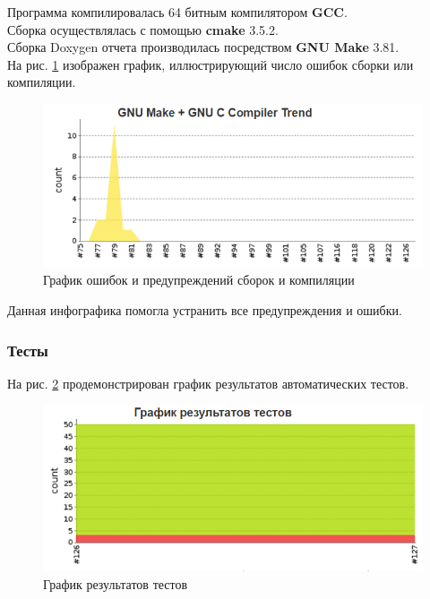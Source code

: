 Программа компилировалась 64 битным компилятором \textbf{GCC}.\\
Сборка осуществлялась с помощью \textbf{cmake} 3.5.2.\\

Сборка Doxygen отчета производилась посредством \textbf{GNU Make} 3.81.\\

На рис. \ref{pic:jenkins_gcc} изображен график, иллюстрирующий число ошибок сборки или компиляции.

\begin{figure}[H]
	\begin{center}
		\includegraphics[scale=0.5]{pics/Jenkins/gcc.png}
	    \caption{График ошибок и предупреждений сборок и компиляции} 
		\label{pic:jenkins_gcc}
	\end{center}
\end{figure}

Данная инфографика помогла устранить все предупреждения и ошибки.

\subsubsection*{Тесты}

На рис. \ref{pic:jenkins_tests} продемонстрирован график результатов автоматических тестов.

\begin{figure}[H]
	\begin{center}
		\includegraphics[scale=0.5]{pics/Jenkins/tests.png}
	    \caption{График результатов тестов} 
		\label{pic:jenkins_tests}
	\end{center}
\end{figure}

